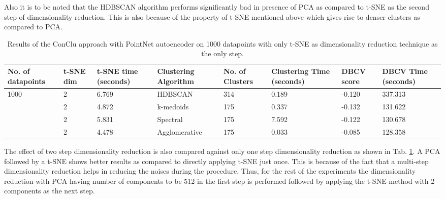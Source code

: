Also it is to be noted that the \ac{HDBSCAN} algorithm performs significantly bad in presence of \ac{PCA} as compared to \ac{t-SNE} as the second step of dimensionality reduction. This is also because of the property of \ac{t-SNE} mentioned above which gives rise to denser clusters as compared to \ac{PCA}.  

\begin{table}[H]
  \setlength\extrarowheight{10pt}
  \caption{Results of the ConClu approach with PointNet autoencoder on 1000 datapoints with only \ac{t-SNE} as dimensionality reduction technique as the only  step. }
  \centering
  \begin{tabular}{|p{30pt}|p{30pt}|p{30pt}|p{60pt}|p{50pt}|p{40pt}|p{30pt}|p{30pt}|}
      \toprule
      No. of datapoints & \ac{t-SNE} dim	& \ac{t-SNE} time (seconds) & Clustering Algorithm & No. of Clusters & Clustering Time (seconds) & \ac{DBCV} score & \ac{DBCV} Time (seconds)\\
      \midrule
      \multirow{4}{30pt}{1000} & 2	& 6.769 & \ac{HDBSCAN}	& 314	& 0.189 & -0.120 & 337.313 \\ \cline{2-8} 
                                & 2	& 4.872 & k-medoids	& 175	& 0.337 & -0.132
                                & 131.622 \\ \cline{2-8} 
                                & 2	& 5.831	& Spectral	& 175	& 7.592 & -0.122	& 130.678 \\ \cline{2-8}
                                & 2	& 4.478 & Agglomerative	& 175	& 0.033 & -0.085 & 128.358 \\ 
      \bottomrule
  \end{tabular}
  \label{tab:conclu_1000_without_reduction}
\end{table}

The effect of two step dimensionality reduction is also compared against only one step dimensionality reduction as shown in Tab. \ref{tab:conclu_1000_without_reduction}. A \ac{PCA} followed by a \ac{t-SNE} shows better results as compared to directly applying \ac{t-SNE} just once. This is because of the fact that a multi-step dimensionality reduction helps in reducing the noises during the procedure. Thus, for the rest of the experiments the dimensionality reduction with \ac{PCA} having number of components to be 512 in the first step is performed followed by applying the \ac{t-SNE} method with 2 components as the next step. 

